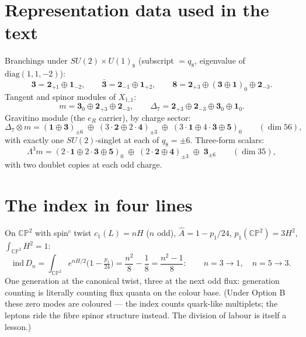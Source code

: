 \documentclass[11pt]{article}
\newcommand{\X}{X_{1,1}}
\newcommand{\CP}{\mathbb{CP}}
\begin{document}
\section{Representation data used in the text}\label{app:tables}
Branchings under $SU(2)\times U(1)_8$ (subscript $=q_8$, eigenvalue of
$\mathrm{diag}(1,1,-2)$):
\[
\mathbf 3=\mathbf 2_{+1}\oplus\mathbf 1_{-2},\qquad
\bar{\mathbf 3}=\mathbf 2_{-1}\oplus\mathbf 1_{+2},\qquad
\mathbf 8=\mathbf 2_{+3}\oplus(\mathbf 3\oplus\mathbf 1)_0\oplus\mathbf 2_{-3}.
\]
Tangent and spinor modules of $\X$:
\[
m=\mathbf 3_0\oplus\mathbf 2_{+3}\oplus\mathbf 2_{-3},\qquad
\Delta_7=\mathbf 2_{+3}\oplus\mathbf 2_{-3}\oplus\mathbf 3_0\oplus\mathbf 1_0 .
\]
Gravitino module (the $e_R$ carrier), by charge sector:
\[
\Delta_7\otimes m=(\mathbf 1\oplus\mathbf 3)_{\pm6}
\;\oplus\;(3\cdot\mathbf 2\oplus2\cdot\mathbf 4)_{\pm3}
\;\oplus\;(3\cdot\mathbf 1\oplus4\cdot\mathbf 3\oplus\mathbf 5)_0
\qquad(\dim 56),
\]
with exactly one $SU(2)$-singlet at each of $q_8=\pm6$. Three-form scalars:
\[
\Lambda^3 m=(2\cdot\mathbf 1\oplus2\cdot\mathbf 3\oplus\mathbf 5)_0
\;\oplus\;(2\cdot\mathbf 2\oplus\mathbf 4)_{\pm3}
\;\oplus\;\mathbf 3_{\pm6}\qquad(\dim 35),
\]
with two doublet copies at each odd charge.

\section{The index in four lines}\label{app:index}
On $\CP^2$ with spin$^c$ twist $c_1(L)=nH$ ($n$ odd), $\hat A = 1 - p_1/24$,
$p_1(\CP^2)=3H^2$, $\int_{\CP^2}H^2=1$:
\[
\mathrm{ind}\,D_n=\int_{\CP^2}e^{nH/2}\Big(1-\tfrac{p_1}{24}\Big)
=\frac{n^2}{8}-\frac18=\frac{n^2-1}{8}:
\qquad n=3\to1,\quad n=5\to3 .
\]
One generation at the canonical twist, three at the next odd flux: generation counting is
literally counting flux quanta on the colour base. (Under Option B these zero modes are
coloured --- the index counts quark-like multiplets; the leptons ride the fibre spinor
structure instead. The division of labour is itself a lesson.)
\end{document}
